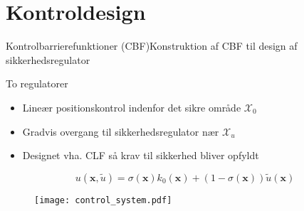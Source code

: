 \section{Kontroldesign}
\begin{frame}{Kontrolbarrierefunktioner (CBF)}{Konstruktion af CBF til design af sikkerhedsregulator}
	\vspace{2mm}
\begin{block}{To regulatorer}
	\begin{itemize}
		\item Lineær positionskontrol indenfor det sikre område $\mathcal{X}_0$
		\item Gradvis overgang til sikkerhedsregulator nær $\mathcal{X}_u$
		\item Designet vha. CLF så krav til sikkerhed bliver opfyldt
	\end{itemize}
\end{block}
\vspace{-2mm}
\begin{equation*}
u(\mathbf{x},\tilde{u})=\sigma(\mathbf{x})k_0(\mathbf{x})+(1-\sigma(\mathbf{x}))\tilde{u}(\mathbf{x})
\end{equation*}

\begin{figure}[h]
	\centering
	\texttt{[image: control\_system.pdf]}
\end{figure}
	\vspace{5mm}
\end{frame}